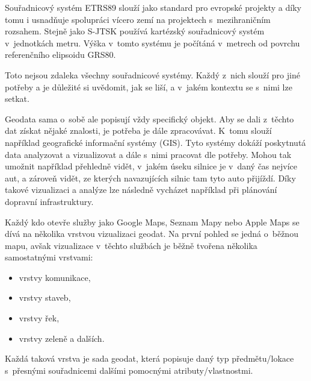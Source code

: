 
Souřadnicový systém ETRS89 slouží jako standard pro evropské projekty a díky tomu i usnadňuje spolupráci vícero zemí na projektech s~mezihraničním rozsahem.
Stejně jako S-JTSK používá kartézský souřadnicový systém v~jednotkách metru. Výška v~tomto systému je počítáná v~metrech od povrchu referenčního elipsoidu GRS80.

Toto nejsou zdaleka všechny souřadnicové systémy. Každý z~nich slouží pro jiné potřeby a je důležité si uvědomit, jak se liší, a v~jakém kontextu se s~nimi lze setkat.



Geodata sama o~sobě ale popisují vždy specifický objekt. Aby se dali z~těchto dat získat nějaké znalosti, je potřeba je dále zpracovávat. K~tomu slouží například geografické informační systémy (GIS). Tyto systémy dokáží poskytnutá data analyzovat a vizualizovat a dále s~nimi pracovat dle potřeby. Mohou tak umožnit například přehledně vidět, v~jakém úseku silnice je v~daný čas nejvíce aut, a zároveň vidět, ze kterých navazujících silnic tam tyto auto přijíždí. Díky takové vizualizaci a analýze lze následně vycházet například při plánování dopravní infrastruktury.

Každý kdo otevře služby jako Google Maps, Seznam Mapy nebo Apple Maps se dívá na několika vrstvou vizualizaci geodat. Na první pohled se jedná o~běžnou mapu, avšak vizualizace v~těchto službách je běžně tvořena několika samostatnými vrstvami:

\begin{itemize}
    \item vrstvy komunikace,
    \item vrstvy staveb,
    \item vrstvy řek,
    \item vrstvy zeleně a dalších.
\end{itemize}

Každá taková vrstva je sada geodat, která popisuje daný typ předmětu/lokace s~přesnými souřadnicemi dalšími pomocnými atributy/vlastnostmi.


